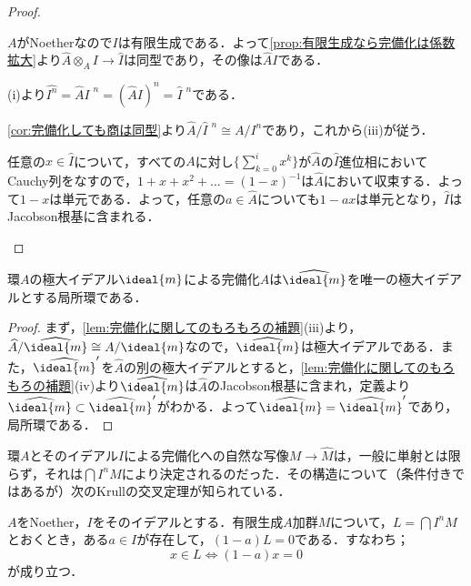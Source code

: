 \begin{proof}
	\begin{sakura}
		\item $A$がNoetherなので$I$は有限生成である．よって\ref{prop:有限生成なら完備化は係数拡大}より$\widehat{A}\otimes_A I\to\widehat{I}$は同型であり，その像は$\widehat{A}I$である．
		
		\item (i)より$\widehat{I^n}=\widehat{A}I{\phantom{|}}^n=(\widehat{A}I)^n=\widehat{I}{\phantom{|}}^n$である．
		
		\item \ref{cor:完備化しても商は同型}より$\widehat{A}/\widehat{I}{\phantom{|}}^n\cong A/I^n$であり，これから(iii)が従う．
		
		\item 任意の$x\in\widehat{I}$について，すべての$A$に対し$\{\sum_{k=0}^i x^k\}$が$\widehat{A}$の$\widehat{I}$進位相においてCauchy列をなすので，$1+x+x^2+\dots=(1-x)^{-1}$は$\widehat{A}$において収束する．よって$1-x$は単元である．よって，任意の$a\in\widehat{A}$についても$1-ax$は単元となり，$\widehat{I}$はJacobson根基に含まれる．
	\end{sakura}
\end{proof}

\begin{prop}
	環$A$の極大イデアル$\ideal{m}$による完備化$\widehat{A}$は$\widehat{\ideal{m}}$を唯一の極大イデアルとする局所環である．
\end{prop}

\begin{proof}
	まず，\ref{lem:完備化に関してのもろもろの補題}(iii)より，$\widehat{A}/\widehat{\ideal{m}}\cong A/\ideal{m}$なので，$\widehat{\ideal{m}}$は極大イデアルである．また，$\widehat{\ideal{m}}'$を$\widehat{A}$の別の極大イデアルとすると，\ref{lem:完備化に関してのもろもろの補題}(iv)より$\widehat{\ideal{m}}$は$\widehat{A}$のJacobson根基に含まれ，定義より$\widehat{\ideal{m}}\subset\widehat{\ideal{m}}'$がわかる．よって$\widehat{\ideal{m}}=\widehat{\ideal{m}}'$であり，局所環である．
\end{proof}

環$A$とそのイデアル$I$による完備化への自然な写像$M\to\widehat{M}$は，一般に単射とは限らず，それは$\bigcap I^nM$により決定されるのだった．その構造について（条件付きではあるが）次のKrullの交叉定理が知られている．

\begin{thm}[Krullの交叉定理]
	$A$をNoether，$I$をそのイデアルとする．有限生成$A$加群$M$について，$L=\bigcap I^nM$とおくとき，ある$a\in I$が存在して，$(1-a)L=0$である．すなわち；
	\[x\in L\Longleftrightarrow (1-a)x=0\]
	が成り立つ．
\end{thm}

